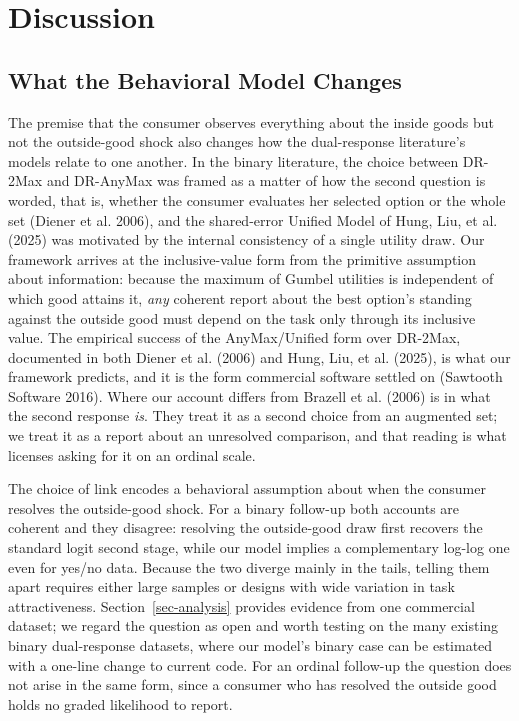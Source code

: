 \documentclass[
  letterpaper,
  DIV=11,
  numbers=noendperiod]{scrartcl}
\theoremstyle{plain}
\theoremstyle{plain}
\theoremstyle{plain}
\theoremstyle{remark}
\begin{document}
\section{Discussion}\label{sec-discussion}

\subsection{What the Behavioral Model
Changes}\label{what-the-behavioral-model-changes}

The premise that the consumer observes everything about the inside goods
but not the outside-good shock also changes how the dual-response
literature's models relate to one another. In the binary literature, the
choice between DR-2Max and DR-AnyMax was framed as a matter of how the
second question is worded, that is, whether the consumer evaluates her
selected option or the whole set (Diener et al. 2006), and the
shared-error Unified Model of Hung, Liu, et al. (2025) was motivated by
the internal consistency of a single utility draw. Our framework arrives
at the inclusive-value form from the primitive assumption about
information: because the maximum of Gumbel utilities is independent of
which good attains it, \emph{any} coherent report about the best
option's standing against the outside good must depend on the task only
through its inclusive value. The empirical success of the AnyMax/Unified
form over DR-2Max, documented in both Diener et al. (2006) and Hung,
Liu, et al. (2025), is what our framework predicts, and it is the form
commercial software settled on (Sawtooth Software 2016). Where our
account differs from Brazell et al. (2006) is in what the second
response \emph{is}. They treat it as a second choice from an augmented
set; we treat it as a report about an unresolved comparison, and that
reading is what licenses asking for it on an ordinal scale.

The choice of link encodes a behavioral assumption about when the
consumer resolves the outside-good shock. For a binary follow-up both
accounts are coherent and they disagree: resolving the outside-good draw
first recovers the standard logit second stage, while our model implies
a complementary log-log one even for yes/no data. Because the two
diverge mainly in the tails, telling them apart requires either large
samples or designs with wide variation in task attractiveness.
Section~\ref{sec-analysis} provides evidence from one commercial
dataset; we regard the question as open and worth testing on the many
existing binary dual-response datasets, where our model's binary case
can be estimated with a one-line change to current code. For an ordinal
follow-up the question does not arise in the same form, since a consumer
who has resolved the outside good holds no graded likelihood to report.
\end{document}
